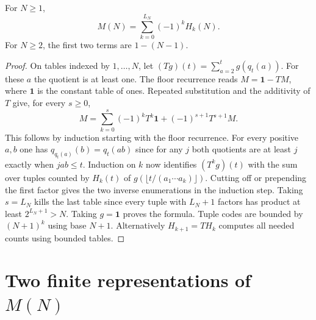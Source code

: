 \begin{theorem}\label{thm:hyperboloid}
For $N\ge1$,
\[
 M(N)=\sum_{k=0}^{L_N}(-1)^k H_k(N).
\]
For $N\ge2$, the first two terms are $1-(N-1)$.
\end{theorem}
\begin{proof}
On tables indexed by $1,\ldots,N$, let
$(Tg)(t)=\sum_{a=2}^{t}g(q_t(a))$. For these $a$ the quotient is at
least one. The floor recurrence reads $M=\mathbf{1}-TM$, where
$\mathbf{1}$ is the constant table of ones. Repeated substitution and
the additivity of $T$ give, for every $s\ge0$,
\[
 M=\sum_{k=0}^s(-1)^kT^k\mathbf{1}+(-1)^{s+1}T^{s+1}M.
\]
This follows by induction starting with the floor recurrence. For every
positive $a,b$ one has $q_{q_t(a)}(b)=q_t(ab)$ since for any $j$ both
quotients are at least $j$ exactly when $jab\le t$.
Induction on $k$ now identifies $(T^kg)(t)$ with the sum over tuples
counted by $H_k(t)$ of $g(\lfloor t/(a_1\cdots a_k)\rfloor)$. Cutting
off or prepending the first factor gives the two inverse enumerations
in the induction step. Taking $s=L_N$ kills the last table since
every tuple with $L_N+1$ factors has product at least $2^{L_N+1}>N$.
Taking $g=\mathbf{1}$ proves the formula. Tuple codes are bounded by
$(N+1)^k$ using base $N+1$. Alternatively $H_{k+1}=TH_k$ computes all
needed counts using bounded tables.
\end{proof}

\section{Two finite representations of \texorpdfstring{$M(N)$}{M(N)}}\label{sec:finite-representations}
